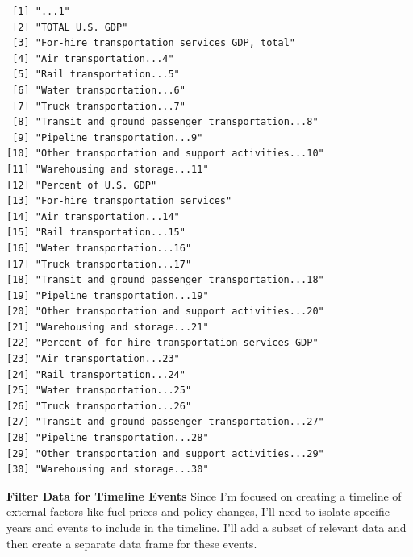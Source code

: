 \documentclass[
  letterpaper,
  DIV=11,
  numbers=noendperiod]{scrreprt}
\begin{document}
\begin{verbatim}
 [1] "...1"                                            
 [2] "TOTAL U.S. GDP"                                  
 [3] "For-hire transportation services GDP, total"     
 [4] "Air transportation...4"                          
 [5] "Rail transportation...5"                         
 [6] "Water transportation...6"                        
 [7] "Truck transportation...7"                        
 [8] "Transit and ground passenger transportation...8" 
 [9] "Pipeline transportation...9"                     
[10] "Other transportation and support activities...10"
[11] "Warehousing and storage...11"                    
[12] "Percent of U.S. GDP"                             
[13] "For-hire transportation services"                
[14] "Air transportation...14"                         
[15] "Rail transportation...15"                        
[16] "Water transportation...16"                       
[17] "Truck transportation...17"                       
[18] "Transit and ground passenger transportation...18"
[19] "Pipeline transportation...19"                    
[20] "Other transportation and support activities...20"
[21] "Warehousing and storage...21"                    
[22] "Percent of for-hire transportation services GDP" 
[23] "Air transportation...23"                         
[24] "Rail transportation...24"                        
[25] "Water transportation...25"                       
[26] "Truck transportation...26"                       
[27] "Transit and ground passenger transportation...27"
[28] "Pipeline transportation...28"                    
[29] "Other transportation and support activities...29"
[30] "Warehousing and storage...30"                    
\end{verbatim}

\textbf{Filter Data for Timeline Events} Since I'm focused on creating a
timeline of external factors like fuel prices and policy changes, I'll
need to isolate specific years and events to include in the timeline.
I'll add a subset of relevant data and then create a separate data frame
for these events.
\end{document}
